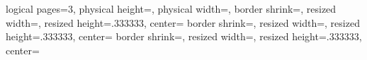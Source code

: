 %
%
%
%
%
\setlength\multicolsep{\topsep}%
\setlength\multicolsep{0pt}%
%
%
%
%
%
%
%
%
\def\deuxpagessurune{%
    \geometry{paperheight=148.5mm,bottom=15mm}%
    \pgfpagesuselayout{2 on 1}[a4paper,border shrink=-2mm]%
    \pgfpageslogicalpageoptions{1}{border code=\pgfstroke}%
  }%
%
%
%
\def\npagessurune#1{%
    \geometry{paperheight=297mm/#1,bottom=15mm}%
    \pgfpagesuselayout{#1 on 1}[a4paper,border shrink=-2mm]%
    \pgfpageslogicalpageoptions{2}{border code=\pgfstroke}%
  }%
%
%
%
%
{%
  \edef\pgfpageoptionheight{\the\paperwidth}%
  \edef\pgfpageoptionwidth{\the\paperheight}%
  \def\pgfpageoptionborder{0pt}%
}%
{%
  \pgfpagesphysicalpageoptions
  {%
    logical pages=3,%
    physical height=\pgfpageoptionheight,%
    physical width=\pgfpageoptionwidth,%
  }%
    {%
      border shrink=\pgfpageoptionborder,%
      resized width=\pgfphysicalwidth,%
      resized height=.333333\pgfphysicalheight,%
      center=\pgfpoint{.5\pgfphysicalwidth}{.833333\pgfphysicalheight}%
    }%
    {%
      border shrink=\pgfpageoptionborder,%
      resized width=\pgfphysicalwidth,%
      resized height=.333333\pgfphysicalheight,%
      center=\pgfpoint{.5\pgfphysicalwidth}{.5\pgfphysicalheight}%
    }%
    {%
      border shrink=\pgfpageoptionborder,%
      resized width=\pgfphysicalwidth,%
      resized height=.333333\pgfphysicalheight,%
      center=\pgfpoint{.5\pgfphysicalwidth}{.166667\pgfphysicalheight}%
    }%
}%
%
%
%
%
%
